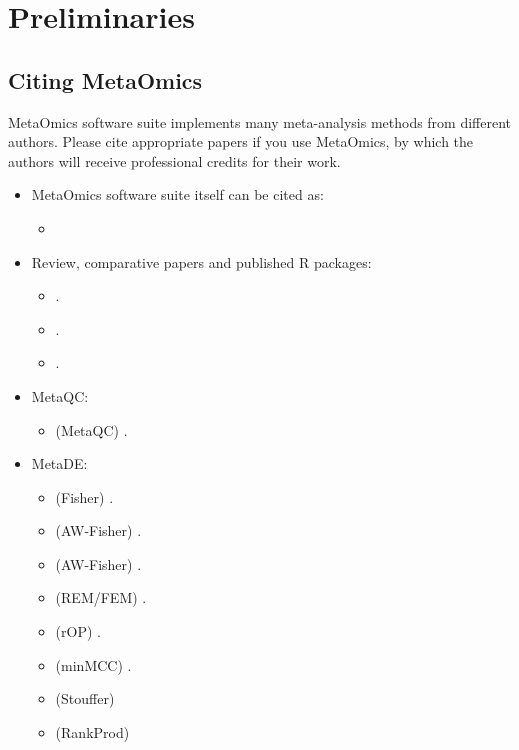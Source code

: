 \section{Preliminaries}
\subsection{Citing MetaOmics}
MetaOmics software suite implements many meta-analysis methods from different authors. 
Please cite appropriate papers if you use MetaOmics,
by which the authors will receive professional credits for their work.

\begin{itemize}

\item MetaOmics software suite itself can be cited as: 

\begin{itemize}
\item {}
\end{itemize}

\item Review, comparative papers and published R packages:
\begin{itemize}
\item {}.
\item {}.
\item {}.
\end{itemize}

\item MetaQC: 
\begin{itemize}
\item (MetaQC) .
\end{itemize}

\item MetaDE: 
\begin{itemize}
\item (Fisher) .
\item (AW-Fisher) .
\item (AW-Fisher) .
\item (REM/FEM) .
\item (rOP) .
\item (minMCC) .
\item (Stouffer) 
\item (RankProd)  
\end{itemize}


\end{itemize}
